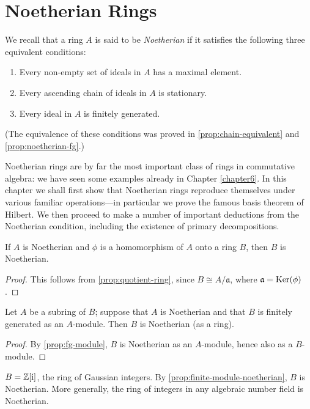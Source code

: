 \chapter{Noetherian Rings}\label{chapter7}

We recall that a ring $A$ is said to be \emph{Noetherian} if it satisfies the following three equivalent conditions:
\begin{enumerate}
    \item Every non-empty set of ideals in $A$ has a maximal element.
    \item Every ascending chain of ideals in $A$ is stationary.
    \item Every ideal in $A$ is finitely generated.
\end{enumerate}
(The equivalence of these conditions was proved in \eqref{prop:chain-equivalent} and \eqref{prop:noetherian-fg}.)

Noetherian rings are by far the most important class of rings in commutative algebra: we have seen some examples already in Chapter \ref{chapter6}. In this chapter we shall first show that Noetherian rings reproduce themselves under various familiar operations---in particular we prove the famous basis theorem of Hilbert. We then proceed to make a number of important deductions from the Noetherian condition, including the existence of primary decompositions.

\begin{proposition}\label{prop:quotient-noetherian}
    If $A$ is Noetherian and $\phi$ is a homomorphism of $A$ onto a ring $B$, then $B$ is Noetherian.
\end{proposition}

\begin{proof}
    This follows from \eqref{prop:quotient-ring}, since $B \cong A/\mathfrak{a}$, where $\mathfrak{a} = \operatorname{Ker}(\phi)$.
\end{proof}

\begin{proposition}\label{prop:finite-module-noetherian}
    Let $A$ be a subring of $B$; suppose that $A$ is Noetherian and that $B$ is finitely generated as an $A$-module. Then $B$ is Noetherian (as a ring).
\end{proposition}

\begin{proof}
    By \eqref{prop:fg-module}, $B$ is Noetherian as an $A$-module, hence also as a $B$-module.
\end{proof}

\begin{example}\label{ex:gaussian-integers}
    $B = \mathbb{Z}[\mathrm{i}]$, the ring of Gaussian integers. By \eqref{prop:finite-module-noetherian}, $B$ is Noetherian. More generally, the ring of integers in any algebraic number field is Noetherian.
\end{example}

